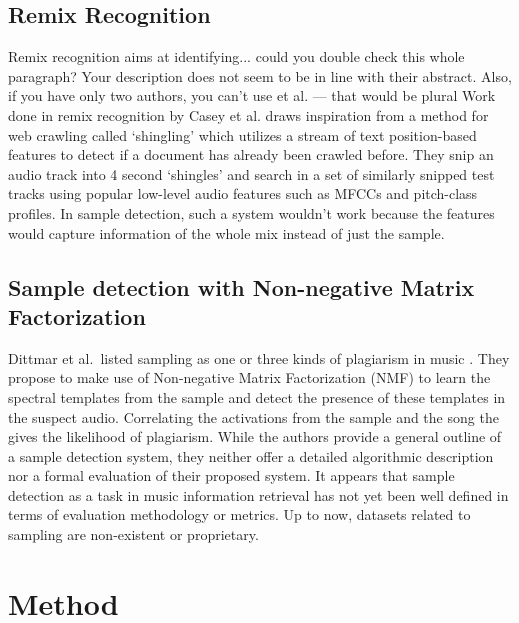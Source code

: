 \documentclass{article}
\begin{document}
\subsection{Remix Recognition}
Remix recognition aims at identifying... {\color{red}could you double check this whole paragraph? Your description does not seem to be in line with their abstract. Also, if you have only two authors, you can't use et al. --- that would be plural}
Work done in remix recognition by Casey et al. \cite{caseyRemix} draws inspiration from a method for web crawling called `shingling' which utilizes a stream of text position-based features to detect if a document has already been crawled before. They snip an audio track into 4 second `shingles' and search in a set of similarly snipped test tracks using popular low-level audio features such as MFCCs and pitch-class profiles. In sample detection, such a system wouldn't work because the features would capture information of the whole mix instead of just the sample.

\subsection{Sample detection with Non-negative Matrix Factorization}
%
Dittmar et al.\ listed sampling as one or three kinds of plagiarism in music \cite{dittmar2012audio}. They propose to make use of Non-negative Matrix Factorization (NMF) to learn the spectral templates from the sample and detect the presence of these templates in the suspect audio. Correlating the activations from the sample and the song the gives the likelihood of plagiarism.
%
While the authors provide a general outline of a sample detection system, they neither offer a detailed algorithmic description nor a formal evaluation of their proposed system. It appears that sample detection as a task in music information retrieval has not yet been well defined in terms of evaluation methodology or metrics. Up to now, datasets related to sampling are non-existent or proprietary.


\section{Method}
\label{algo}
\end{document}
